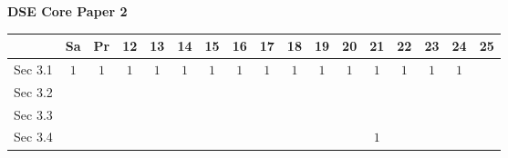 \documentclass[12pt, a4paper]{article}
\begin{document}
\begin{absolutelynopagebreak}
\begin{center}
\textbf{DSE Core Paper 2}
\end{center}
\begin{center}
\begin{tabular}{|l|c|c|c|c|c|c|c|c|c|c|c|c|c|c|c|c|}
\hline
        & Sa & Pr & 12 & 13 & 14 & 15 & 16 & 17 & 18 & 19 & 20 & 21 & 22 & 23 & 24 & 25 \\\hline\hline
Sec 3.1 &  $1$ &  $1$ &  $1$ &  $1$ &  $1$ &  $1$ &  $1$ &  $1$ &  $1$ &  $1$ &  $1$ &  $1$ &  $1$ &  $1$ &  $1$ &  \\\hline
Sec 3.2 &  &  &  &  &  &  &  &  &  &  &  &  &  &  &  &  \\\hline
Sec 3.3 &  &  &  &  &  &  &  &  &  &  &  &  &  &  &  &  \\\hline
Sec 3.4 &  &  &  &  &  &  &  &  &  &  &  &  $1$ &  &  &  &  \\\hline
\end{tabular}
\end{center}
\end{absolutelynopagebreak}
\end{document}
